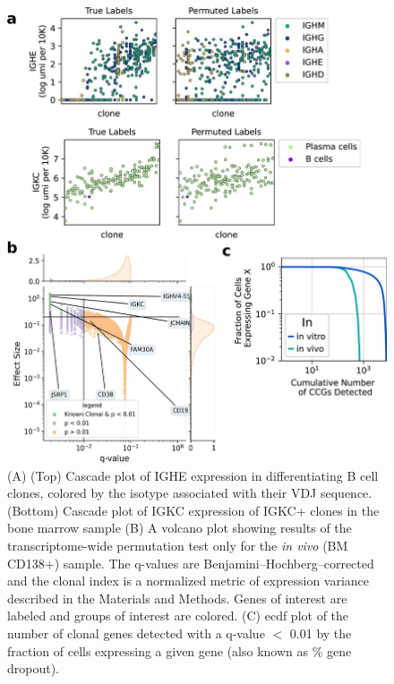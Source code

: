 \begin{figure}[hbt!]
\centering
\includegraphics[width=13cm, keepaspectratio]{figs/paper2/figs4_bcd.jpg}
\caption[Analysis of persistent \textit{in vivo} transcriptional programs.]{(A) (Top) Cascade plot of IGHE expression in differentiating B cell clones, colored by the isotype associated with their VDJ sequence. (Bottom) Cascade plot of IGKC expression of IGKC+ clones in the bone marrow sample (B) A volcano plot showing results of the transcriptome-wide permutation test only for the \textit{in vivo} (BM CD138+) sample. The q-values are Benjamini–Hochberg–corrected and the clonal index is a normalized metric of expression variance described in the Materials and Methods. Genes of interest are labeled and groups of interest are colored. (C) ecdf plot of the number of clonal genes detected with a q-value $<$ 0.01 by the fraction of cells expressing a given gene (also known as \% gene dropout).}
\label{fig:paper2_fig_s4}
\end{figure}


